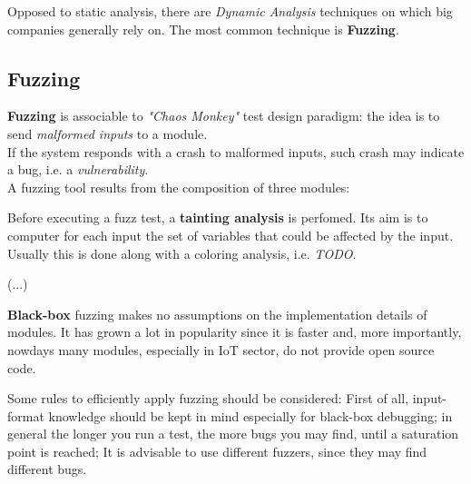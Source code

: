 Opposed to static analysis, there are \textit{Dynamic Analysis} techniques on which big companies generally rely on.
The most common technique is \textbf{Fuzzing}.

\subsection{Fuzzing}
\textbf{Fuzzing} is associable to \textit{"Chaos Monkey"} test design paradigm:
the idea is to send \textit{malformed inputs} to a module.\\
If the system responds with a crash to malformed inputs, such crash may indicate a bug, i.e. a \textit{vulnerability}.\\
A fuzzing tool results from the composition of three modules:
\begin{center}
\end{center}

Before executing a fuzz test, a \textbf{tainting analysis} is perfomed.
Its aim is to computer for each input the set of variables that could be affected by the input.
Usually this is done along with a coloring analysis, i.e. \textit{TODO}.

(...)

\textbf{Black-box} fuzzing makes no assumptions on the implementation details of modules.
It has grown a lot in popularity since it is faster and, more importantly, nowdays many modules, especially in IoT sector, do not provide open source code.
\nl

Some rules to efficiently apply fuzzing should be considered:
First of all, input-format knowledge should be kept in mind especially for black-box debugging;
in general the longer you run a test, the more bugs you may find, until a saturation point is reached;
It is advisable to use different fuzzers, since they may find different bugs.

